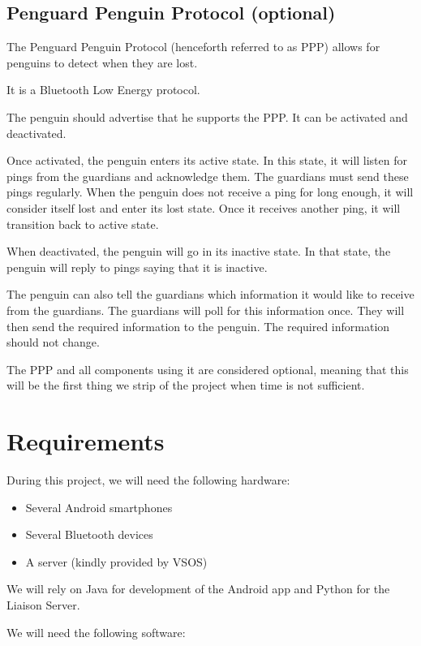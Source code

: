 \documentclass{report}
\begin{document}
\subsection{Penguard Penguin Protocol (optional)}

The Penguard Penguin Protocol (henceforth referred to as PPP) allows for penguins to detect when they are lost.

It is a Bluetooth Low Energy protocol.

The penguin should advertise that he supports the PPP. It can be activated and deactivated.

Once activated, the penguin enters its active state. In this state, it will listen for pings from the guardians and acknowledge them. The guardians must send these pings regularly. When the penguin does not receive a ping for long enough, it will consider itself lost and enter its lost state. Once it receives another ping, it will transition back to active state.

When deactivated, the penguin will go in its inactive state. In that state, the penguin will reply to pings saying that it is inactive.

The penguin can also tell the guardians which information it would like to receive from the guardians. The guardians will poll for this information once. They will then send the required information to the penguin. The required information should not change.

The PPP and all components using it are considered optional, meaning that this will be the first thing we strip of the project when time is not sufficient.

\section{Requirements}

During this project, we will need the following hardware:

\begin{itemize}
    \item Several Android smartphones
    \item Several Bluetooth devices
    \item A server (kindly provided by VSOS)
\end{itemize}

We will rely on Java for development of the Android app and Python for the Liaison Server.

We will need the following software:
\end{document}

